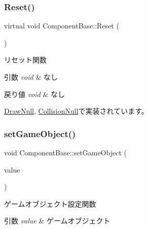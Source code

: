 \mbox{\label{class_component_base_a484df9edcbe83b1a98aacc55b50bfdda}} 
\subsubsection{\texorpdfstring{Reset()}{Reset()}}
{\footnotesize\ttfamily virtual void Component\+Base\+::\+Reset (\begin{DoxyParamCaption}{ }\end{DoxyParamCaption})\hspace{0.3cm}{\ttfamily [pure virtual]}}



リセット関数 


\begin{DoxyParams}{引数}
{\em void} & なし \\
\hline
\end{DoxyParams}

\begin{DoxyRetVals}{戻り値}
{\em void} & なし \\
\hline
\end{DoxyRetVals}


\mbox{\hyperlink{class_draw_null_a1e295d7fa2d2b78cfe3121e0a0fcd799}{Draw\+Null}}, \mbox{\hyperlink{class_collision_null_a288a42487bf161a02ec716aea246e1a6}{Collision\+Null}}で実装されています。

\mbox{\label{class_component_base_ae671317076d3c89ba0793ae2cd34d5ea}} 
\subsubsection{\texorpdfstring{set\+Game\+Object()}{setGameObject()}}
{\footnotesize\ttfamily void Component\+Base\+::set\+Game\+Object (\begin{DoxyParamCaption}\item[{\mbox{\hyperlink{class_game_object_base}{Game\+Object\+Base}} $\ast$}]{value }\end{DoxyParamCaption})}



ゲームオブジェクト設定関数 


\begin{DoxyParams}{引数}
{\em value} & ゲームオブジェクト \\
\hline
\end{DoxyParams}

